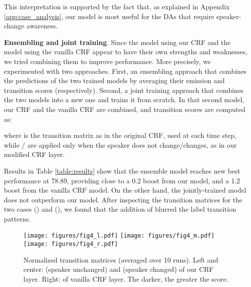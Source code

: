 \documentclass[11pt,a4paper]{article}
\begin{document}
This interpretation is supported by the fact that, as explained in Appendix \ref{app:case_analysis}, our model is most useful for the DAs that require speaker-change awareness.

\noindent \textbf{Ensembling and joint training}.
Since the model using our CRF and the model using the vanilla CRF appear to have their own strengths and weaknesses, we tried combining them to improve performance.
More precisely, we experimented with two approaches.
First, an ensembling approach that combines the predictions of the two trained models by averaging their emission and transition scores (respectively).
Second, a joint training approach that combines the two models into a new one and trains it from scratch.
In that second model, our CRF and the vanilla CRF are combined, and transition scores are computed as:

{\small
\setlength{\abovedisplayskip}{-3pt}
\setlength{\belowdisplayskip}{3pt}

}

\noindent where  is the transition matrix as in the original CRF, used at each time step, while / are applied only when the speaker does not change/changes, as in our modified CRF layer.

Results in Table \ref{table:results} show that the ensemble model reaches new best performance at 78.89, providing close to a 0.2 boost from our model, and a 1.2 boost from the vanilla CRF model.
On the other hand, the jointly-trained model does not outperform our model.
After inspecting the transition matrices for the two cases () and (), we found that the addition of  blurred the label transition patterns.

\begin{figure*}[ht]

\centering
\texttt{[image: figures/fig4\_l.pdf]}
\texttt{[image: figures/fig4\_m.pdf]} \hspace{0.15cm}
\texttt{[image: figures/fig4\_r.pdf]}

\caption{Normalized transition matrices (averaged over 10 runs). Left and center:  (speaker unchanged) and  (speaker changed) of our CRF layer. Right:  of vanilla CRF layer.
The darker, the greater the score. \label{fig:transition}}
\end{figure*}
\end{document}
